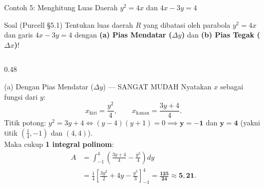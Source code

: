 \documentclass[aspectratio=43,10pt]{beamer}
\begin{document}
\begin{frame}{Contoh 5: Menghitung Luas Daerah $y^2 = 4x$ dan $4x - 3y = 4$}
    \begin{exampleblock}{Soal (Purcell \S5.1)}
        \scriptsize
        Tentukan luas daerah $R$ yang dibatasi oleh parabola $y^2 = 4x$ dan garis $4x - 3y = 4$ dengan \textbf{(a) Pias Mendatar ($\Delta y$)} dan \textbf{(b) Pias Tegak ($\Delta x$)}!
    \end{exampleblock}

    \begin{columns}[T]
        \begin{column}{0.48\textwidth}
            \begin{block}{(a) Dengan Pias Mendatar ($\Delta y$) --- SANGAT MUDAH}
                \scriptsize\abovedisplayskip=2pt\belowdisplayskip=2pt
                Nyatakan $x$ sebagai fungsi dari $y$:
                $$x_{\text{kiri}} = \frac{y^2}{4}, \qquad x_{\text{kanan}} = \frac{3y + 4}{4}.$$
                Titik potong: $y^2 = 3y + 4 \iff (y - 4)(y + 1) = 0 \implies \mathbf{y = -1}$ dan $\mathbf{y = 4}$ (yakni titik $\left(\frac{1}{4}, -1\right)$ dan $(4, 4)$).\\
                Maka cukup \textbf{1 integral polinom}:
                \begin{align*}
                    A &= \int_{-1}^{4} \left(\frac{3y + 4}{4} - \frac{y^2}{4}\right)dy\\
                    &= \frac{1}{4}\left[\frac{3y^2}{2} + 4y - \frac{y^3}{3}\right]_{-1}^{4} = \mathbf{\frac{125}{24} \approx 5{,}21}.
                \end{align*}
            \end{block}
        \end{column}


\end{columns}
\end{frame}
\end{document}
